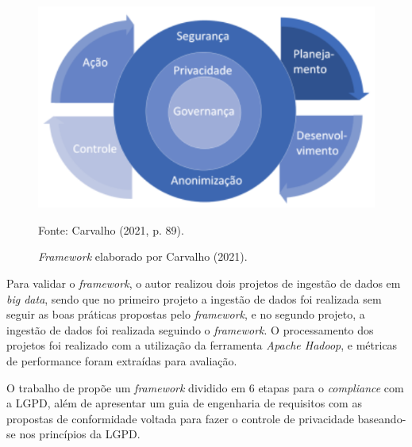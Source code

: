 \documentclass[
	12pt,				%
	openright,			%
	oneside,			%
	a4paper,			%
	english,			%
	french,				%
	spanish,			%
	brazil,				%
	]{abntex2}
\begin{document}
\begin{figure}[ht]
    \centering
    \caption{\textit{Framework} elaborado por Carvalho (2021).}
    \includegraphics[width=4.7in]{Images/08Carvalho2021.png}
    \label{fig: Carvalho}
    
    \centering \small Fonte: Carvalho (2021, p. 89).
\end{figure}
Para validar o \textit{framework}, o autor realizou dois projetos de ingestão de dados em \textit{big data}, sendo que no primeiro projeto a ingestão de dados foi realizada sem seguir as boas práticas propostas pelo \textit{framework}, e no segundo projeto, a ingestão de dados foi realizada seguindo o \textit{framework}. O processamento dos projetos foi realizado com a utilização da ferramenta \textit{Apache Hadoop}, e métricas de performance foram extraídas para avaliação.



O trabalho de \cite{Menegazzi2021} propõe um \textit{framework} dividido em 6 etapas para o \textit{compliance} com a LGPD, além de apresentar um guia de engenharia de requisitos com as propostas de conformidade voltada para fazer o controle de privacidade baseando-se nos princípios da LGPD.
\end{document}
